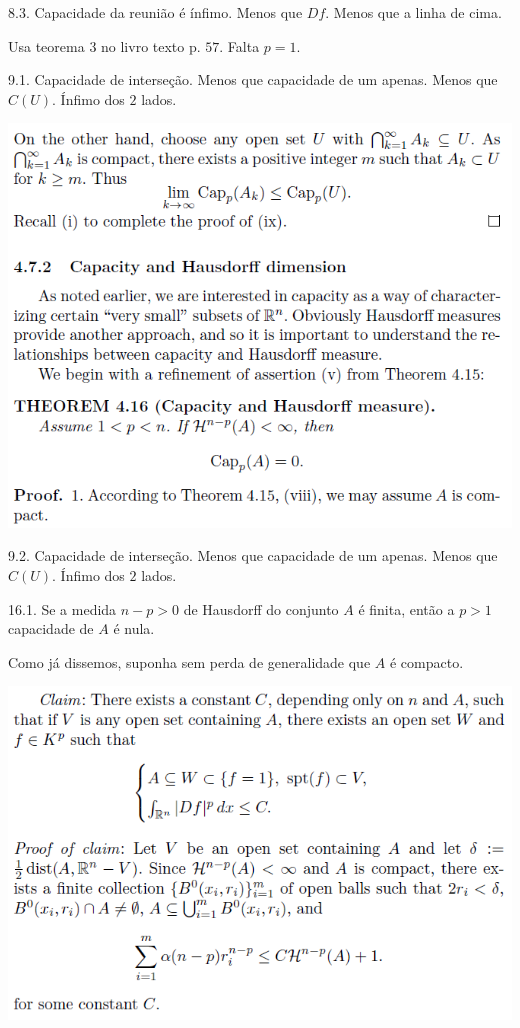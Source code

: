 \documentclass[12pt]{article}
\begin{document}
8.3. Capacidade da reuni\~ao \'e \'infimo. Menos que $Df$. Menos que a linha de cima.

Usa teorema $3$ no livro texto p. $57$. Falta $p = 1$.

9.1. Capacidade de interse\c{c}\~ao. Menos que capacidade de um apenas. Menos que $C(U)$. \'Infimo dos $2$ lados.

\vspace{300mm}

		\begin{center}
		\includegraphics[scale=.9]{17}
		\end{center}

9.2. Capacidade de interse\c{c}\~ao. Menos que capacidade de um apenas. Menos que $C(U)$. \'Infimo dos $2$ lados.

16.1. Se a medida $n - p > 0$ de Hausdorff do conjunto $A$ \'e finita, ent\~ao a $p > 1$ capacidade de $A$ \'e nula.

Como j\'a dissemos, suponha sem perda de generalidade que $A$ \'e compacto.

\vspace{300mm}

		\begin{center}
		\includegraphics{18}
		\end{center}
\end{document}
